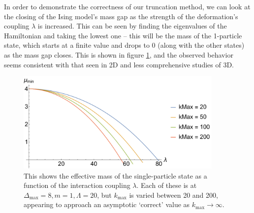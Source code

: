 In order to demonstrate the correctness of our truncation method, we can look at
the closing of the Ising model's mass gap as the strength of the deformation's 
coupling $\lambda$ is increased. This can be seen by finding the eigenvalues of 
the Hamiltonian and taking the lowest one -- this will be the mass of the 
1-particle state, which starts at a finite value and drops to 0 (along with the 
other states) as the mass gap closes. This is shown in figure \ref{fig:massgap}, 
and the observed behavior seems consistent with that seen in 2D and less 
comprehensive studies of 3D.

\begin{figure}
\centering
\includegraphics[width=0.9\textwidth]{truncation_chapter/massgap}	
\caption[Closing of the Ising model mass gap as a function of $\lambda$ for 
    different $k_\mathrm{max}$]{This shows the effective mass of the 
    single-particle state as a function of the interaction coupling $\lambda$. 
    Each of these is at $\Delta_\mathrm{max} = 8, m = 1, \Lambda = 20$, but 
    $k_\mathrm{max}$ is varied between 20 and 200, appearing to approach an 
    asymptotic `correct' value as $k_\mathrm{max} \to \infty$.} 
\label{fig:massgap}
\end{figure}


 

